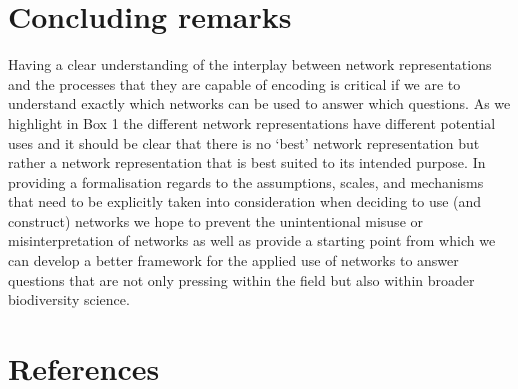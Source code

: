 \documentclass[
]{article}
\begin{document}
\section{Concluding remarks}\label{concluding-remarks}

Having a clear understanding of the interplay between network
representations and the processes that they are capable of encoding is
critical if we are to understand exactly which networks can be used to
answer which questions. As we highlight in Box 1 the different network
representations have different potential uses and it should be clear
that there is no `best' network representation but rather a network
representation that is best suited to its intended purpose. In providing
a formalisation regards to the assumptions, scales, and mechanisms that
need to be explicitly taken into consideration when deciding to use (and
construct) networks we hope to prevent the unintentional misuse or
misinterpretation of networks as well as provide a starting point from
which we can develop a better framework for the applied use of networks
to answer questions that are not only pressing within the field but also
within broader biodiversity science.

\section*{References}\label{references}
\end{document}
